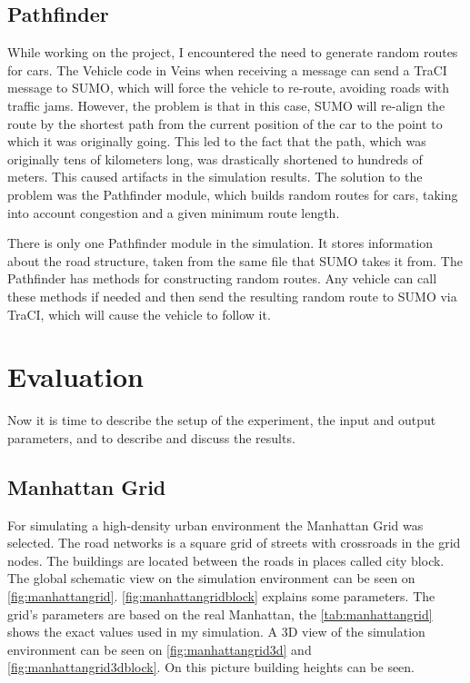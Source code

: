 \documentclass[]{nsm-thesis}
\begin{document}
\section{Pathfinder}

While working on the project, I encountered the need to generate random routes for cars. The Vehicle code in Veins when receiving a message can send a TraCI message to SUMO, which will force the vehicle to re-route, avoiding roads with traffic jams. However, the problem is that in this case, SUMO will re-align the route by the shortest path from the current position of the car to the point to which it was originally going. This led to the fact that the path, which was originally tens of kilometers long, was drastically shortened to hundreds of meters. This caused artifacts in the simulation results. The solution to the problem was the Pathfinder module, which builds random routes for cars, taking into account congestion and a given minimum route length.

There is only one Pathfinder module in the simulation. It stores information about the road structure, taken from the same file that SUMO takes it from. The Pathfinder has methods for constructing random routes. Any vehicle can call these methods if needed and then send the resulting random route to SUMO via TraCI, which will cause the vehicle to follow it.

\chapter{Evaluation}

Now it is time to describe the setup of the experiment, the input and output parameters, and to describe and discuss the results.

\section{Manhattan Grid}

For simulating a high-density urban environment the Manhattan Grid was selected. The road networks is a square grid of streets with crossroads in the grid nodes. The buildings are located between the roads in places called city block. The global schematic view on the simulation environment can be seen on \cref{fig:manhattangrid}. \cref{fig:manhattangridblock} explains some parameters. The grid's parameters are based on the real Manhattan, the \cref{tab:manhattangrid} shows the exact values used in my simulation. A 3D view of the simulation environment can be seen on \cref{fig:manhattangrid3d} and \cref{fig:manhattangrid3dblock}. On this picture building heights can be seen.
\end{document}
